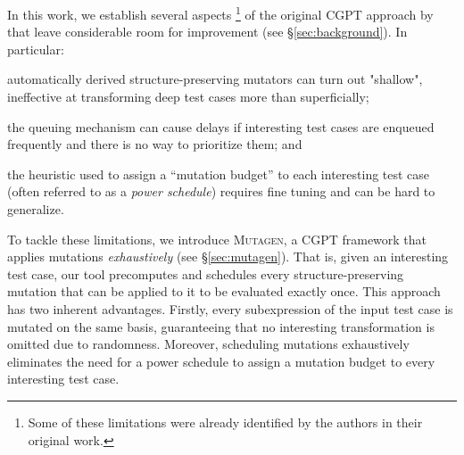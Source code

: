 \documentclass[sigconf,review,anonymous]{acmart}
\newcommand{\fuzzchick}{\textit{FuzzChick}\xspace}
\newcommand{\mutagen}{\textsc{Mutagen}\xspace}
\begin{document}
In this work, we establish several aspects%
%
\footnote{Some of these limitations were already identified by the authors in
their original work.}
%
of the original CGPT approach by \citeauthor{lampropoulos2019coverage} that
leave considerable room for improvement (see \S \ref{sec:background}).
%
In particular:
%
\begin{inparaenum}
\item automatically derived structure-preserving mutators can turn out
"shallow", ineffective at transforming deep test cases more than superficially;
\item the queuing mechanism can cause delays if interesting test cases are
  enqueued frequently and there is no way to prioritize them; and
\item the heuristic used to assign a ``mutation budget'' to each interesting
  test case (often referred to as a \emph{power schedule}) requires fine tuning
  and can be hard to generalize.
\end{inparaenum}
%


To tackle these limitations, we introduce \mutagen, a CGPT framework that
applies mutations \emph{exhaustively} (see \S \ref{sec:mutagen}).
%
%
%
%
%
%
That is, given an interesting test case, our tool precomputes and schedules
every structure-preserving mutation that can be applied to it to be evaluated
exactly once.
%
This approach has two inherent advantages. %
%
Firstly,
%
every subexpression of the input test case is mutated on the same basis,
guaranteeing that no interesting transformation is omitted due to randomness.
%
%
Moreover, scheduling mutations exhaustively eliminates the need for a
power schedule to assign a mutation budget to every interesting test case.
\end{document}
